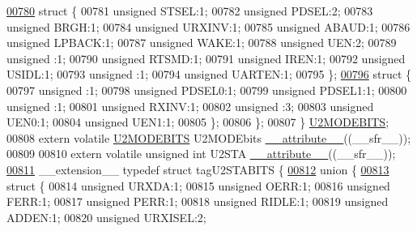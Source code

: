 \begin{DoxyCode}
\hypertarget{a00009_source_l00780}{}\hyperlink{a00009}{00780}     \textcolor{keyword}{struct }\{
00781       \textcolor{keywordtype}{unsigned} STSEL:1;
00782       \textcolor{keywordtype}{unsigned} PDSEL:2;
00783       \textcolor{keywordtype}{unsigned} BRGH:1;
00784       \textcolor{keywordtype}{unsigned} URXINV:1;
00785       \textcolor{keywordtype}{unsigned} ABAUD:1;
00786       \textcolor{keywordtype}{unsigned} LPBACK:1;
00787       \textcolor{keywordtype}{unsigned} WAKE:1;
00788       \textcolor{keywordtype}{unsigned} UEN:2;
00789       \textcolor{keywordtype}{unsigned} :1;
00790       \textcolor{keywordtype}{unsigned} RTSMD:1;
00791       \textcolor{keywordtype}{unsigned} IREN:1;
00792       \textcolor{keywordtype}{unsigned} USIDL:1;
00793       \textcolor{keywordtype}{unsigned} :1;
00794       \textcolor{keywordtype}{unsigned} UARTEN:1;
00795     \};
\hypertarget{a00009_source_l00796}{}\hyperlink{a00009}{00796}     \textcolor{keyword}{struct }\{
00797       \textcolor{keywordtype}{unsigned} :1;
00798       \textcolor{keywordtype}{unsigned} PDSEL0:1;
00799       \textcolor{keywordtype}{unsigned} PDSEL1:1;
00800       \textcolor{keywordtype}{unsigned} :1;
00801       \textcolor{keywordtype}{unsigned} RXINV:1;
00802       \textcolor{keywordtype}{unsigned} :3;
00803       \textcolor{keywordtype}{unsigned} UEN0:1;
00804       \textcolor{keywordtype}{unsigned} UEN1:1;
00805     \};
00806   \};
00807 \} \hyperlink{a00008_dd/d70/a00835}{U2MODEBITS};
00808 \textcolor{keyword}{extern} \textcolor{keyword}{volatile} \hyperlink{a00008_dd/d70/a00835}{U2MODEBITS} U2MODEbits \hyperlink{a00009_a493c46f03454991ccc5aa7a6e1dfb2a7}{\_\_attribute\_\_}((\_\_sfr\_\_));
00809 
00810 \textcolor{keyword}{extern} \textcolor{keyword}{volatile} \textcolor{keywordtype}{unsigned} \textcolor{keywordtype}{int}  U2STA \hyperlink{a00009_a493c46f03454991ccc5aa7a6e1dfb2a7}{\_\_attribute\_\_}((\_\_sfr\_\_));
\hypertarget{a00009_source_l00811}{}\hyperlink{a00008}{00811} \_\_extension\_\_ \textcolor{keyword}{typedef} \textcolor{keyword}{struct }tagU2STABITS \{
\hypertarget{a00009_source_l00812}{}\hyperlink{a00009}{00812}   \textcolor{keyword}{union }\{
\hypertarget{a00009_source_l00813}{}\hyperlink{a00009}{00813}     \textcolor{keyword}{struct }\{
00814       \textcolor{keywordtype}{unsigned} URXDA:1;
00815       \textcolor{keywordtype}{unsigned} OERR:1;
00816       \textcolor{keywordtype}{unsigned} FERR:1;
00817       \textcolor{keywordtype}{unsigned} PERR:1;
00818       \textcolor{keywordtype}{unsigned} RIDLE:1;
00819       \textcolor{keywordtype}{unsigned} ADDEN:1;
00820       \textcolor{keywordtype}{unsigned} URXISEL:2;

\end{DoxyCode}
